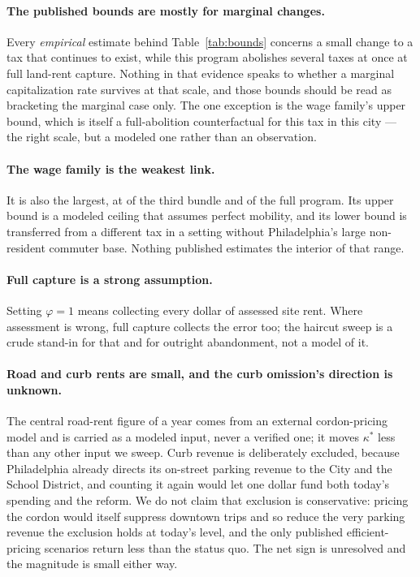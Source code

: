 \documentclass[11pt]{article}
\begin{document}
\paragraph{The published bounds are mostly for marginal changes.} Every \emph{empirical}
estimate behind Table~\ref{tab:bounds} concerns a small change to a tax that continues to
exist, while this program abolishes several taxes at once at full land-rent capture. Nothing in
that evidence speaks to whether a marginal capitalization rate survives at that scale, and
those bounds should be read as bracketing the marginal case only. The one exception is the wage
family's upper bound, which is itself a full-abolition counterfactual for this tax in this city
--- the right scale, but a modeled one rather than an observation.

\paragraph{The wage family is the weakest link.} It is also the largest, at
\StxBThreeWageSharePct{} of the third bundle and \StxBFiveWageSharePct{} of the full program.
Its upper bound is a modeled ceiling that assumes perfect mobility, and its lower bound is
transferred from a different tax in a setting without Philadelphia's large non-resident
commuter base. Nothing published estimates the interior of that range.

\paragraph{Full capture is a strong assumption.} Setting $\varphi = 1$ means collecting every
dollar of assessed site rent. Where assessment is wrong, full capture collects the error too;
the haircut sweep is a crude stand-in for that and for outright abandonment, not a model of it.

\paragraph{Road and curb rents are small, and the curb omission's direction is unknown.} The
central road-rent figure of \StxGCentralM{} a year comes from an external cordon-pricing model
and is carried as a modeled input, never a verified one; it moves $\kappa^*$ less than any
other input we sweep. Curb revenue is deliberately excluded, because Philadelphia already
directs its on-street parking revenue to the City and the School District, and counting it
again would let one dollar fund both today's spending and the reform. We do not claim that
exclusion is conservative: pricing the cordon would itself suppress downtown trips and so
reduce the very parking revenue the exclusion holds at today's level, and the only published
efficient-pricing scenarios return less than the status quo. The net sign is unresolved and
the magnitude is small either way.
\end{document}
